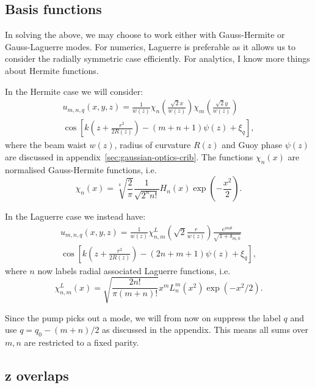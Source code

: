 \documentclass[twocolumn]{revtex4-1}
\begin{document}
\subsection{Basis functions}
\label{sec:basis-functions}

In solving the above, we may choose to work either with Gauss-Hermite
or Gauss-Laguerre modes.  For numerics, Laguerre is preferable as
it allows us to consider the radially symmetric case efficiently.  For
analytics, I know more things about Hermite functions.

In the Hermite case we will consider:
\begin{multline}
  u_{m,n,q}(x,y,z) = 
  \frac{1}{w(z)}
  \chi_n\left( \frac{\sqrt{2} x}{w(z)} \right)
  \chi_m\left( \frac{\sqrt{2} y}{w(z)} \right)
  \\
  \cos \left[
    k \left( z + \frac{r^2}{2R(z)} \right) - (m+n+1) \psi(z) + \xi_{q} \right],
\end{multline}
where the beam waist $w(z)$, radius of curvature $R(z)$ and Guoy phase
$\psi(z)$ are discussed in appendix~\ref{sec:gaussian-optics-crib}.  The
functions $\chi_n(x)$ are normalised Gauss-Hermite functions, i.e.
\begin{displaymath}
  \chi_n(x) = \sqrt[4]{\frac{2}{\pi}}
  \frac{1}{\sqrt{2^n n!}} H_n(x) \exp\left(-\frac{x^2}{2} \right).
\end{displaymath}

In the Laguerre case we instead have:
\begin{multline}
  u_{m,n,q}(x,y,z) = 
  \frac{1}{w(z)}
  \chi^L_{n,m}\left( \sqrt{2}\frac{r}{w(z)} \right)
  \frac{e^{i m \theta}}{\sqrt{1+\delta_{m,0}}}
  \\
  \cos \left[
    k \left( z + \frac{r^2}{2R(z)} \right) - (2n+m+1) \psi(z) + \xi_{q} \right],
\end{multline}
where $n$ now labels radial associated Laguerre functions, i.e.
\begin{displaymath}
  \chi^L_{n,m}(x) = 
  \sqrt{ \frac{2 n!}{\pi (m+n)!}}
  x^m L_n^m(x^2) \exp(-x^2/2).
\end{displaymath}

Since the pump picks out a mode, we will from now on suppress the
label $q$ and use $q = q_0 - (m+n)/2$ as discussed in the appendix.
This means all sums over $m,n$ are restricted to a fixed parity.

\subsection{z overlaps}
\label{sec:z-overlaps}
\end{document}
